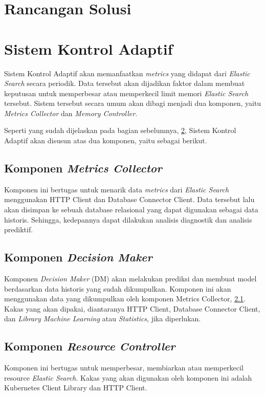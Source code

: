 \section{Rancangan Solusi}

\section{Sistem Kontrol Adaptif}
\label{sec:sistemkontroladaptif}

Sistem Kontrol Adaptif akan memanfaatkan \textit{metrics} yang didapat dari \textit{Elastic Search} secara periodik. Data tersebut akan dijadikan faktor dalam membuat keputusan untuk memperbesar atau memperkecil limit memori \textit{Elastic Search} tersebut. Sistem tersebut secara umum akan dibagi menjadi dua komponen, yaitu \textit{Metrics Collector} dan \textit{Memory Controller}.

Seperti yang sudah dijelaskan pada bagian sebelumnya, \ref{sec:sistemkontroladaptif}, Sistem Kontrol Adaptif akan disusun atas dua komponen, yaitu sebagai berikut.
\subsection{Komponen \textit{Metrics Collector}}
\label{sec:metricscollector}

Komponen ini bertugas untuk menarik data \textit{metrics} dari \textit{Elastic Search} menggunakan HTTP Client dan Database Connector Client. Data tersebut lalu akan disimpan ke sebuah database relasional yang dapat digunakan sebagai data historis. Sehingga, kedepannya dapat dilakukan analisis diagnostik dan analisis prediktif.

\subsection{Komponen \textit{Decision Maker}}
Komponen \textit{Decision Maker} (DM) akan melakukan prediksi dan membuat model berdasarkan data historis yang sudah dikumpulkan.
Komponen ini akan menggunakan data yang dikumpulkan oleh komponen Metrics Collector, \ref{sec:metricscollector}.
Kakas yang akan dipakai, diantaranya HTTP Client, Database Connector Client, dan \textit{Library Machine Learning} atau \textit{Statistics}, jika diperlukan.

\subsection{Komponen \textit{Resource Controller}}

Komponen ini bertugas untuk memperbesar, membiarkan atau memperkecil resource \textit{Elastic Search}. Kakas yang akan digunakan oleh komponen ini adalah Kubernetes Client Library dan HTTP Client.


